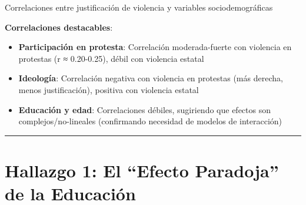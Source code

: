 \documentclass[
  12pt,
]{article}
\providecommand{\tightlist}{%
  \setlength{\itemsep}{0pt}\setlength{\parskip}{0pt}}
\begin{document}
\begin{table}

\caption{\label{tbl-correlaciones}Correlaciones entre justificación de
violencia y variables sociodemográficas}


\end{table}%

\textbf{Correlaciones destacables}:

\begin{itemize}
\tightlist
\item
  \textbf{Participación en protesta}: Correlación moderada-fuerte con
  violencia en protestas (r ≈ 0.20-0.25), débil con violencia estatal
\item
  \textbf{Ideología}: Correlación negativa con violencia en protestas
  (más derecha, menos justificación), positiva con violencia estatal
\item
  \textbf{Educación y edad}: Correlaciones débiles, sugiriendo que
  efectos son complejos/no-lineales (confirmando necesidad de modelos de
  interacción)
\end{itemize}

\begin{center}\rule{0.5\linewidth}{0.5pt}\end{center}

\section{Hallazgo 1: El ``Efecto Paradoja'' de la
Educación}\label{hallazgo-1-el-efecto-paradoja-de-la-educaciuxf3n}
\end{document}
